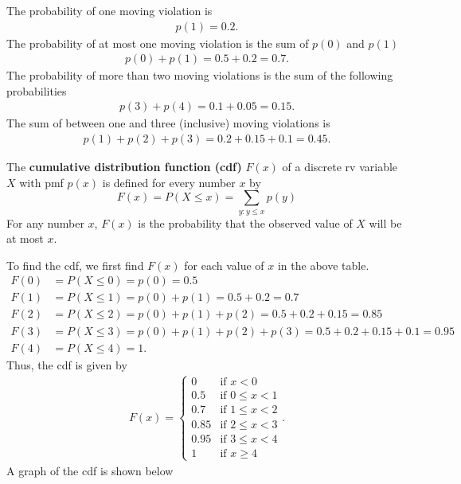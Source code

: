 \documentclass{report}
\begin{document}
 \bigbreak \noindent 
 The probability of one moving violation is
 \begin{align*}
     p(1) = 0.2
 .\end{align*}
 \bigbreak \noindent 
 The probability of at most one moving violation is the sum of $p(0)$ and $p(1)$
 \begin{align*}
     p(0) + p(1) = 0.5 + 0.2 = 0.7
 .\end{align*}
 \bigbreak \noindent 
 The probability of more than two moving violations is the sum of the following probabilities
 \begin{align*}
     p(3) + p(4) = 0.1 + 0.05 = 0.15
 .\end{align*}
 \bigbreak \noindent 
 The sum of between one and three (inclusive) moving violations is 
 \begin{align*}
     p(1) + p(2) + p(3) = 0.2 + 0.15 + 0.1 = 0.45
 .\end{align*}
 \bigbreak \noindent 
 \begin{remark}
          The \textbf{cumulative distribution function (cdf)} \( F(x) \) of a discrete rv variable \( X \) with pmf \( p(x) \) is defined for every number \( x \) by
        \[
            F(x) = P(X \leq x) = \sum_{y: y \leq x} p(y) \tag{3.3}
        \]
        For any number \( x \), \( F(x) \) is the probability that the observed value of \( X \) will be at most \( x \).
 \end{remark}
 \bigbreak \noindent 
 To find the cdf, we first find $F(x)$ for each value of $x$ in the above table.
 \begin{align*}
     F(0) &= P(X \leq 0) = p(0) = 0.5 \\
     F(1)  &= P(X \leq 1) = p(0) + p(1) = 0.5 + 0.2 = 0.7\\
     F(2)  &= P(X \leq 2) = p(0) + p(1) + p(2) = 0.5 + 0.2 + 0.15 = 0.85\\
     F(3)  &= P(X \leq 3) = p(0) + p(1) + p(2) + p(3) = 0.5 + 0.2 + 0.15 + 0.1 = 0.95\\
     F(4)  &= P(X \leq 4) = 1
 .\end{align*}
 \bigbreak \noindent 
 Thus, the cdf is given by
 \begin{align*}
     F(x) = \begin{cases}
         0 & \text{if } x < 0 \\
        0.5 & \text{if } 0 \leq x < 1 \\
        0.7 & \text{if }  1 \leq x < 2 \\
        0.85 & \text{if } 2 \leq x < 3 \\
        0.95 & \text{if } 3 \leq x < 4 \\
        1 & \text{if }  x \geq 4  
     \end{cases}
 .\end{align*}
 \bigbreak \noindent 
 A graph of the cdf is shown below
\begin{figure}[ht]
    \centering
    \label{fig:cdf}
\end{figure}
 
\end{document}
